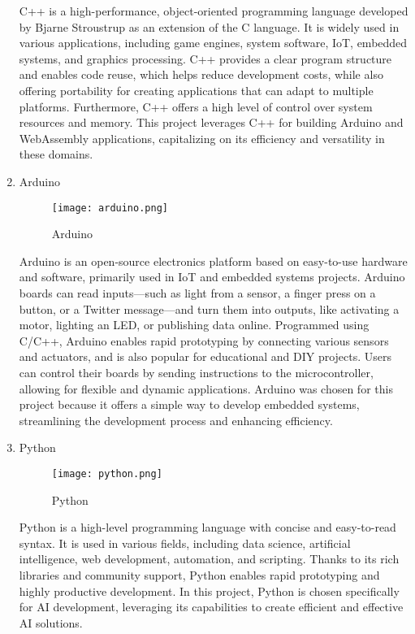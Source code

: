 \documentclass[conference]{IEEEtran}
\begin{document}
\begin{enumerate}[itemsep=2ex, parsep=1ex]
	      C++ is a high-performance, object-oriented programming language developed by
	      Bjarne Stroustrup as an extension of the C language. It is widely used in
	      various applications, including game engines, system software, IoT,
	      embedded systems, and graphics processing. C++ provides a clear program
	      structure and enables code reuse, which helps reduce development costs,
	      while also offering portability for creating applications that can adapt
	      to multiple platforms. Furthermore, C++ offers a high level of control
	      over system resources and memory. This project leverages C++ for building Arduino
	      and WebAssembly applications, capitalizing on its efficiency and
	      versatility in these domains.
	      	      
	\item Arduino
	      	      
	      \begin{figure}[h!]
	      	\centering
	      	\texttt{[image: arduino.png]}
	      	\caption{Arduino}
	      	\label{fig:Arduino}
	      \end{figure}
	      	      
	      Arduino is an open-source electronics platform based on easy-to-use
	      hardware and software, primarily used in IoT and embedded systems projects.
	      Arduino boards can read inputs—such as light from a sensor, a finger press
	      on a button, or a Twitter message—and turn them into outputs, like activating
	      a motor, lighting an LED, or publishing data online. Programmed using C/C++,
	      Arduino enables rapid prototyping by connecting various sensors and actuators,
	      and is also popular for educational and DIY projects. Users can control their
	      boards by sending instructions to the microcontroller, allowing for
	      flexible and dynamic applications. Arduino was chosen for this project because
	      it offers a simple way to develop embedded systems, streamlining the
	      development process and enhancing efficiency.
	      	      
	\item Python
	      	      
	      \begin{figure}[h!]
	      	\centering
	      	\texttt{[image: python.png]}
	      	\caption{Python}
	      	\label{fig:Python}
	      \end{figure}
	      	      
	      Python is a high-level programming language with concise and easy-to-read
	      syntax. It is used in various fields, including data science, artificial intelligence,
	      web development, automation, and scripting. Thanks to its rich libraries and
	      community support, Python enables rapid prototyping and highly productive
	      development. In this project, Python is chosen specifically for AI
	      development, leveraging its capabilities to create efficient and effective
	      AI solutions.
	      	      

\end{enumerate}
\end{document}
